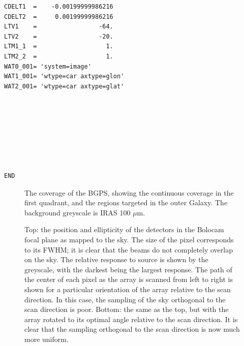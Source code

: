 \documentclass[12pt,preprint]{aastex}
\newcommand{\mum}{\ensuremath{\mu \mathrm{m}}}
\def\Figure#1#2#3#4{
\begin{figure}[htb]
\epsscale{#4}
\plotone{#1}
\caption{#2}
\label{#3}
\end{figure}
}
\begin{document}
\begin{appendix}
\begin{verbatim}
CDELT1  =    -0.00199999986216                                                  
CDELT2  =     0.00199999986216                                                  
LTV1    =                 -64.                                                  
LTV2    =                 -20.                                                  
LTM1_1  =                   1.                                                  
LTM2_2  =                   1.                                                  
WAT0_001= 'system=image'                                                        
WAT1_001= 'wtype=car axtype=glon'                                               
WAT2_001= 'wtype=car axtype=glat'                                               
                                                                                
                                                                                
                                                                                
                                                                                
                                                                                
                                                                                
                                                                                
                                                                                
END                                                          

\end{verbatim}

\end{appendix}

\pagebreak

%



\cite{*}

\pagebreak

\Figure{f1}%
{The coverage of the BGPS, showing the continuous coverage in the
first quadrant, and the regions targeted in the outer Galaxy.  The
background greyscale is IRAS 100 \mum.}{fig:Coverage}{1.0}

\Figure{f2}%
{Top: the position and ellipticity of the detectors in the Bolocam
focal plane as mapped to the sky.  The size of the pixel corresponds
to its FWHM; it is clear that the beams do not completely overlap on
the sky.  The relative response to source is shown by the greyscale,
with the darkest being the largest response.  The path of the center
of each pixel as the array is scanned from left to right is shown for
a particular orientation of the array relative to the scan direction.
In this case, the sampling of the sky orthogonal to the scan direction
is poor.  Bottom: the same as the top, but with the array rotated to
its optimal angle relative to the scan direction.  It is clear that
the sampling orthogonal to the scan direction is now much more
uniform.}{fig:Array}{0.7}
\end{document}
